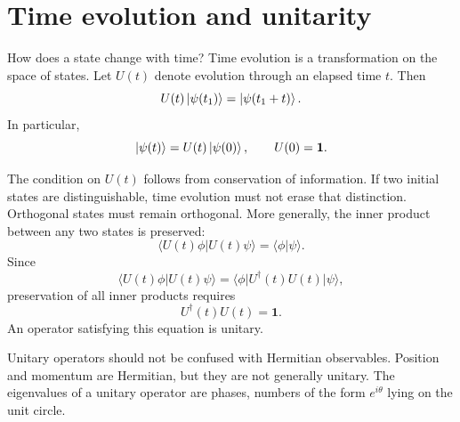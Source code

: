 \section{Time evolution and unitarity}

How does a state change with time? Time evolution is a transformation on the space of states. Let \(U(t)\) denote evolution through an elapsed time \(t\). Then
\begin{equation}
U(t)\left\lvert\psi(t_1)\right\rangle=\left\lvert\psi(t_1+t)\right\rangle.
\end{equation}
In particular,
\begin{equation}
\left\lvert\psi(t)\right\rangle=U(t)\left\lvert\psi(0)\right\rangle,
\qquad
U(0)=\mathbf 1.
\end{equation}

The condition on \(U(t)\) follows from conservation of information. If two initial states are distinguishable, time evolution must not erase that distinction. Orthogonal states must remain orthogonal. More generally, the inner product between any two states is preserved:
\begin{equation}
\langle U(t)\phi|U(t)\psi\rangle
=\langle\phi|\psi\rangle.
\end{equation}
Since
\begin{equation}
\langle U(t)\phi|U(t)\psi\rangle
=\langle\phi|U^\dagger(t)U(t)|\psi\rangle,
\end{equation}
preservation of all inner products requires
\begin{equation}
U^\dagger(t)U(t)=\mathbf 1.
\end{equation}
An operator satisfying this equation is unitary.

\begin{classroomqa}
\end{classroomqa}


Unitary operators should not be confused with Hermitian observables. Position and momentum are Hermitian, but they are not generally unitary. The eigenvalues of a unitary operator are phases, numbers of the form \(e^{i\theta}\) lying on the unit circle.

